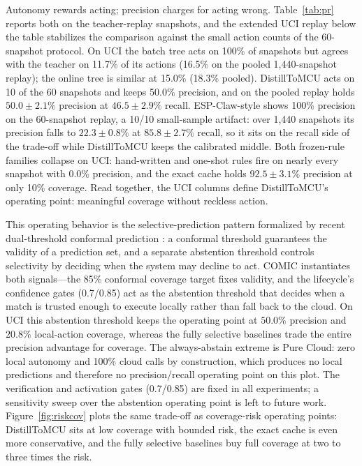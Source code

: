 \documentclass[review]{elsarticle}
\begin{document}
Autonomy rewards acting; precision charges for acting wrong.
Table~\ref{tab:pr} reports both on the teacher-replay snapshots, and the
extended UCI replay below the table stabilizes the comparison against the
small action counts of the 60-snapshot protocol. On UCI the batch tree acts
on 100\% of snapshots but agrees with the teacher on 11.7\% of its actions
(16.5\% on the pooled 1,440-snapshot replay); the online tree is similar at
15.0\% (18.3\% pooled). DistillToMCU acts on 10 of the 60 snapshots and keeps
50.0\% precision, and on the pooled replay holds $50.0 \pm 2.1\%$ precision
at $46.5 \pm 2.9\%$ recall. ESP-Claw-style shows 100\% precision on the
60-snapshot replay, a 10/10 small-sample artifact: over 1,440 snapshots its
precision falls to $22.3 \pm 0.8\%$ at $85.8 \pm 2.7\%$ recall, so it sits on
the recall side of the trade-off while DistillToMCU keeps the calibrated
middle. Both frozen-rule families collapse on UCI: hand-written and one-shot
rules fire on nearly every snapshot with 0.0\% precision, and the exact cache
holds $92.5 \pm 3.1\%$ precision at only 10\% coverage. Read together, the
UCI columns define DistillToMCU's operating point: meaningful coverage
without reckless action.

This operating behavior is the selective-prediction pattern formalized by
recent dual-threshold conformal prediction \cite{36}: a conformal threshold
guarantees the validity of a prediction set, and a separate abstention
threshold controls selectivity by deciding when the system may decline to
act. COMIC instantiates both signals---the 85\% conformal coverage target
fixes validity, and the lifecycle's confidence gates (0.7/0.85) act as the
abstention threshold that decides when a match is trusted enough to execute
locally rather than fall back to the cloud. On UCI this abstention threshold
keeps the operating point at $50.0\%$ precision and $20.8\%$ local-action
coverage, whereas the fully selective baselines trade the entire precision
advantage for coverage. The always-abstain extreme is Pure Cloud: zero local
autonomy and 100\% cloud calls by construction, which produces no local
predictions and therefore no precision/recall operating point on this plot.
The verification and activation gates (0.7/0.85) are fixed in all experiments;
a sensitivity sweep over the abstention operating point is left to future
work. Figure~\ref{fig:riskcov} plots the same trade-off as
coverage-risk operating points: DistillToMCU sits at low coverage with
bounded risk, the exact cache is even more conservative, and the fully
selective baselines buy full coverage at two to three times the risk.
\end{document}
